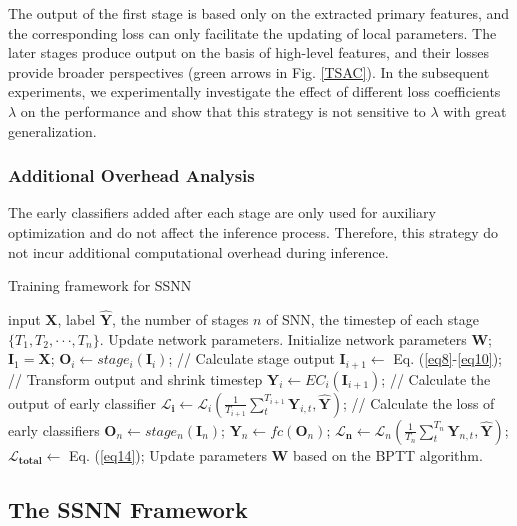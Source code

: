 \documentclass[letterpaper]{article} %
\begin{document}
The output of the first stage is based only on the extracted primary features, and the corresponding loss can only facilitate the updating of local parameters. The later stages produce output on the basis of high-level features, and their losses provide broader perspectives (green arrows in Fig. \ref{TSAC}). In the subsequent experiments, we experimentally investigate the effect of different loss coefficients $\lambda$ on the performance and show that this strategy is not sensitive to $\lambda$ with great generalization.

\subsubsection{Additional Overhead Analysis}
The early classifiers added after each stage are only used for auxiliary optimization and do not affect the inference process. Therefore, this strategy do not incur additional computational overhead during inference.
\begin{algorithm}[tb]
\caption{Training framework for SSNN} 
\label{alg1}
\begin{algorithmic}[1]
\REQUIRE input $\boldsymbol{X}$, label $\hat{\boldsymbol{Y}}$, the number of stages $n$ of SNN, the timestep of each stage $\{T_1,T_2,\cdot \cdot \cdot, T_n\}$.
\ENSURE Update network parameters.
\STATE Initialize network parameters $\boldsymbol{W}$;
\STATE $\boldsymbol{I}_1=\boldsymbol{X}$;
\STATE $\boldsymbol{O}_i \leftarrow stage_i(\boldsymbol{I}_i)$; // Calculate stage output
\STATE $\boldsymbol{I}_{i+1} \leftarrow$ Eq. (\ref{eq8}-\ref{eq10}); // Transform output and shrink timestep
\STATE $\boldsymbol{Y}_{i} \leftarrow EC_i(\boldsymbol{I}_{i+1})$; // Calculate the output of early classifier
\STATE $\boldsymbol{\mathcal{L}_{i}} \leftarrow \boldsymbol{\mathcal{L}}_i(\frac{1}{T_{i+1}}\sum_t^{T_{i+1}} \boldsymbol{Y}_{i,t},\hat{\boldsymbol{Y}})$; // Calculate the loss of early classifiers
\ENDFOR
\STATE $\boldsymbol{O}_n \leftarrow stage_n(\boldsymbol{I}_{n})$;
\STATE $\boldsymbol{Y}_n \leftarrow fc(\boldsymbol{O}_n)$;
\STATE $\boldsymbol{\mathcal{L}_{n}} \leftarrow \boldsymbol{\mathcal{L}}_n(\frac{1}{T_n}\sum_t^{T_n} \boldsymbol{Y}_{n,t},\hat{\boldsymbol{Y}})$;
\STATE $\boldsymbol{\mathcal{L}_{total}} \leftarrow$ Eq. (\ref{eq14});
\STATE Update parameters $\boldsymbol{W}$ based on the BPTT algorithm.
\end{algorithmic}
\end{algorithm}
\subsection{The SSNN Framework}
\end{document}
